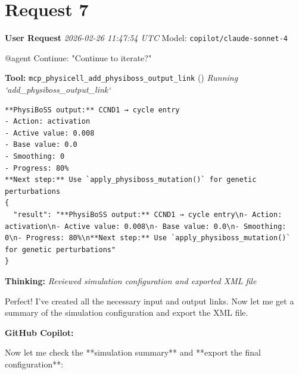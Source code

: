\documentclass[11pt,a4paper]{article}
\begin{document}
\section{Request 7}
\begin{userbox}
\textbf{User Request}
\quad \textit{2026-02-26 11:47:54 UTC}
\quad Model: \texttt{copilot/claude-sonnet-4}

@agent Continue: "Continue to iterate?"

\end{userbox}
\begin{toolokbox}
\textbf{Tool:} \texttt{mcp\_physicell\_add\_physiboss\_output\_link} (\checkmark)
\textit{Running `add\_physiboss\_output\_link`}
\begin{lstlisting}
**PhysiBoSS output:** CCND1 → cycle entry
- Action: activation
- Active value: 0.008
- Base value: 0.0
- Smoothing: 0
- Progress: 80%
**Next step:** Use `apply_physiboss_mutation()` for genetic perturbations
{
  "result": "**PhysiBoSS output:** CCND1 → cycle entry\n- Action: activation\n- Active value: 0.008\n- Base value: 0.0\n- Smoothing: 0\n- Progress: 80%\n**Next step:** Use `apply_physiboss_mutation()` for genetic perturbations"
}
\end{lstlisting}
\end{toolokbox}
\begin{thinkbox}
\textbf{Thinking:} \textit{Reviewed simulation configuration and exported XML file}

Perfect! I've created all the necessary input and output links. Now let me get a summary of the simulation configuration and export the XML file.

\end{thinkbox}
\begin{copilotbox}
\textbf{GitHub Copilot:}

Now let me check the **simulation summary** and **export the final configuration**:

\end{copilotbox}
\end{document}
